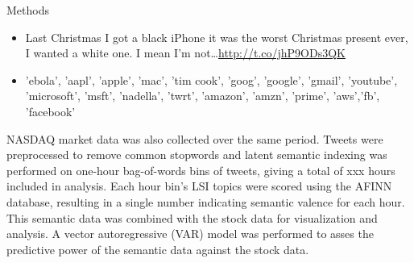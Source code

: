 \documentclass[final]{beamer}
\newlength{\onecolwid}
\begin{document}
\begin{frame}[t]
\begin{columns}[t]
\begin{column}{\onecolwid}
\begin{block}{Methods}
{\begin{itemize}
            \item \small{Last Christmas I got a black iPhone it was the
                worst Christmas present ever, I wanted a white one. I mean I'm
                not\ldots \url{http://t.co/jhP9ODs3QK}}
            \end{itemize}
            \begin{itemize}\label{keywords}
            \item \small{ 'ebola', 'aapl', 'apple', 'mac', 'tim cook', 'goog',
            'google', 'gmail', 'youtube', 'microsoft', 'msft',
            'nadella', 'twrt', 'amazon', 'amzn', 'prime', 'aws','fb',
          'facebook'}
          \end{itemize}
          NASDAQ market data was also
          collected over the same period. Tweets were preprocessed to remove
          common stopwords and latent semantic indexing was performed on
          one-hour bag-of-words bins of tweets, giving a total of xxx hours
          included in analysis. Each hour bin's LSI topics were scored using
          the AFINN database, resulting in a single number indicating semantic
          valence for each hour. This semantic data was combined with the stock
          data for visualization and analysis. A vector autoregressive (VAR)
          model was performed to asses the predictive power of the semantic
          data against the stock data.
          }
      \end{block}
    \end{column}


\end{columns}
\end{frame}
\end{document}
